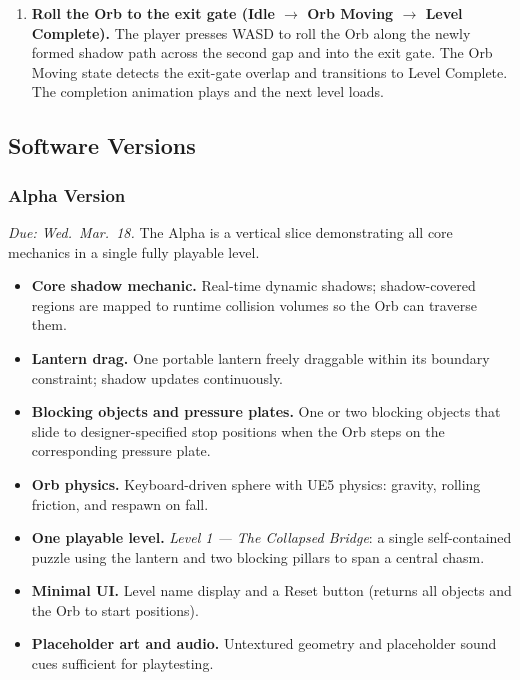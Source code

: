 \documentclass[11pt, letterpaper]{article}
\begin{document}
\begin{enumerate}[leftmargin=1.5em, itemsep=4pt]
            \item \textbf{Roll the Orb to the exit gate
                  (Idle $\to$ Orb Moving $\to$ Level Complete).}
                  The player presses WASD to roll the Orb along the newly
                  formed shadow path across the second gap and into the exit
                  gate. The Orb Moving state detects the exit-gate overlap and
                  transitions to Level Complete. The completion animation plays
                  and the next level loads.

        \end{enumerate}

    \subsection{Software Versions}

        \subsubsection{Alpha Version}
        \textit{Due: Wed.\ Mar.\ 18.} The Alpha is a vertical slice demonstrating
        all core mechanics in a single fully playable level.

        \begin{itemize}[leftmargin=1.5em, itemsep=2pt]
            \item \textbf{Core shadow mechanic.} Real-time dynamic shadows; shadow-covered regions are mapped to runtime
                  collision volumes so the Orb can traverse them.
            \item \textbf{Lantern drag.} One portable lantern freely draggable
                  within its boundary constraint; shadow updates continuously.
            \item \textbf{Blocking objects and pressure plates.} One or two
                  blocking objects that slide to designer-specified stop
                  positions when the Orb steps on the corresponding pressure
                  plate.
            \item \textbf{Orb physics.} Keyboard-driven sphere with UE5
                  physics: gravity, rolling friction, and respawn on fall.
            \item \textbf{One playable level.} \textit{Level 1 --- The
                  Collapsed Bridge}: a single self-contained puzzle using the
                  lantern and two blocking pillars to span a central chasm.
            \item \textbf{Minimal UI.} Level name display and a Reset button
                  (returns all objects and the Orb to start positions).
            \item \textbf{Placeholder art and audio.} Untextured geometry and
                  placeholder sound cues sufficient for playtesting.
        \end{itemize}
\end{document}

